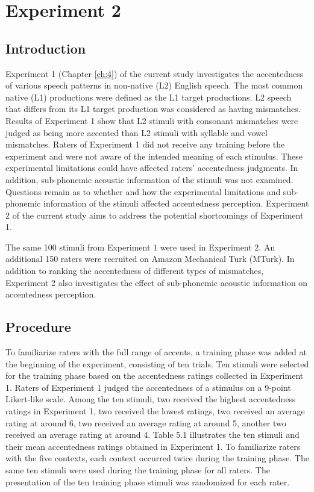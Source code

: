 \chapter{Experiment 2}
\label{ch:5}
\section{Introduction}

Experiment 1 (Chapter \ref{ch:4}) of the current study investigates the accentedness of various speech patterns in non-native (L2) English speech. The most common native (L1) productions were defined as the L1 target productions. L2 speech that differs from its L1 target production was considered as having mismatches. Results of Experiment 1 show that L2 stimuli with consonant mismatches were judged as being more accented than L2 stimuli with syllable and vowel mismatches. Raters of Experiment 1 did not receive any training before the experiment and were not aware of the intended meaning of each stimulus. These experimental limitations could have affected raters’ accentedness judgments. In addition, sub-phonemic acoustic information of the stimuli was not examined. Questions remain as to whether and how the experimental limitations and sub-phonemic information of the stimuli affected accentedness perception. Experiment 2 of the current study aims to address the potential shortcomings of Experiment 1. 

The same 100 stimuli from Experiment 1 were used in Experiment 2. An additional 150 raters were recruited on Amazon Mechanical Turk (MTurk). In addition to ranking the accentedness of different types of mismatches, Experiment 2 also investigates the effect of sub-phonemic acoustic information on accentedness perception.


\section{Procedure}
To familiarize raters with the full range of accents, a training phase was added at the beginning of the experiment, consisting of ten trials. Ten stimuli were selected for the training phase based on the accentedness ratings collected in Experiment 1. Raters of Experiment 1 judged the accentedness of a stimulus on a 9-point Likert-like scale. Among the ten stimuli, two received the highest accentedness ratings in Experiment 1, two received the lowest ratings, two received an average rating at around 6, two received an average rating at around 5, another two received an average rating at around 4. Table 5.1 illustrates the ten stimuli and their mean accentedness ratings obtained in Experiment 1. To familiarize raters with the five contexts, each context occurred twice during the training phase. The same ten stimuli were used during the training phase for all raters. The presentation of the ten training phase stimuli was randomized for each rater.

